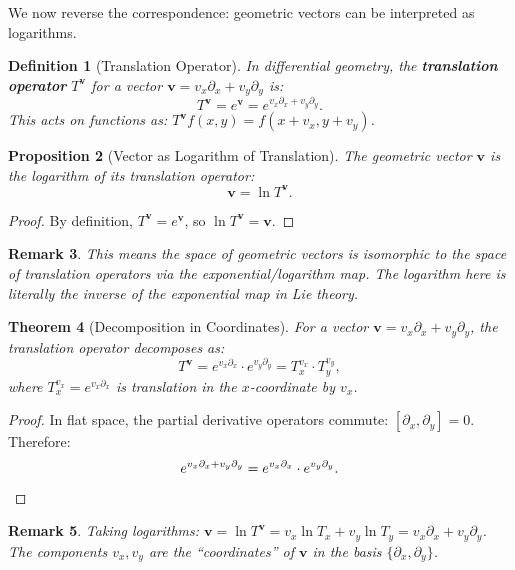 \documentclass[11pt]{article}
\newtheorem{definition}{Definition}[section]
\newtheorem{theorem}[definition]{Theorem}
\newtheorem{proposition}[definition]{Proposition}
\newtheorem{remark}[definition]{Remark}
\begin{document}
We now reverse the correspondence: geometric vectors can be interpreted as logarithms.

\begin{definition}[Translation Operator]
In differential geometry, the \textbf{translation operator} $T^{\mathbf{v}}$ for a vector $\mathbf{v} = v_x \partial_x + v_y \partial_y$ is:
\[
T^{\mathbf{v}} = e^{\mathbf{v}} = e^{v_x \partial_x + v_y \partial_y}.
\]
This acts on functions as: $T^{\mathbf{v}} f(x,y) = f(x + v_x, y + v_y)$.
\end{definition}

\begin{proposition}[Vector as Logarithm of Translation]
The geometric vector $\mathbf{v}$ is the logarithm of its translation operator:
\[
\mathbf{v} = \ln T^{\mathbf{v}}.
\]
\end{proposition}

\begin{proof}
By definition, $T^{\mathbf{v}} = e^{\mathbf{v}}$, so $\ln T^{\mathbf{v}} = \mathbf{v}$.
\end{proof}

\begin{remark}
This means the space of geometric vectors is isomorphic to the space of translation operators via the exponential/logarithm map. The logarithm here is literally the inverse of the exponential map in Lie theory.
\end{remark}

\begin{theorem}[Decomposition in Coordinates]
For a vector $\mathbf{v} = v_x \partial_x + v_y \partial_y$, the translation operator decomposes as:
\[
T^{\mathbf{v}} = e^{v_x \partial_x} \cdot e^{v_y \partial_y} = T_x^{v_x} \cdot T_y^{v_y},
\]
where $T_x^{v_x} = e^{v_x \partial_x}$ is translation in the $x$-coordinate by $v_x$.
\end{theorem}

\begin{proof}
In flat space, the partial derivative operators commute: $[\partial_x, \partial_y] = 0$. Therefore:
\[
e^{v_x \partial_x + v_y \partial_y} = e^{v_x \partial_x} \cdot e^{v_y \partial_y}. \qedhere
\]
\end{proof}

\begin{remark}
Taking logarithms: $\mathbf{v} = \ln T^{\mathbf{v}} = v_x \ln T_x + v_y \ln T_y = v_x \partial_x + v_y \partial_y$. The components $v_x, v_y$ are the ``coordinates'' of $\mathbf{v}$ in the basis $\{\partial_x, \partial_y\}$.
\end{remark}
\end{document}
